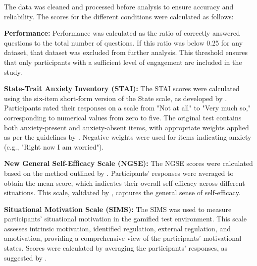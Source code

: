 The data was cleaned and processed before analysis to ensure accuracy and reliability. The scores for the different conditions were calculated as follows:

\begin{APAitemize}
\item \textbf{Performance:} Performance was calculated as the ratio of correctly answered questions to the total number of questions. If this ratio was below 0.25 for any dataset, that dataset was excluded from further analysis. This threshold ensures that only participants with a sufficient level of engagement are included in the study.

\item \textbf{State-Trait Anxiety Inventory (STAI):} The STAI scores were calculated using the six-item short-form version of the State scale, as developed by \textcite{marteauDevelopmentSixitemShortform1992}. Participants rated their responses on a scale from "Not at all" to "Very much so," corresponding to numerical values from zero to five. The original test contains both anxiety-present and anxiety-absent items, with appropriate weights applied as per the guidelines by \textcite{marteauDevelopmentSixitemShortform1992}. Negative weights were used for items indicating anxiety (e.g., "Right now I am worried").

\item \textbf{New General Self-Efficacy Scale (NGSE):} The NGSE scores were calculated based on the method outlined by \textcite{chenValidationNewGeneral2001}. Participants' responses were averaged to obtain the mean score, which indicates their overall self-efficacy across different situations. This scale, validated by \textcite{chenValidationNewGeneral2001}, captures the general sense of self-efficacy.

\item \textbf{Situational Motivation Scale (SIMS):} The SIMS was used to measure participants' situational motivation in the gamified test environment. This scale assesses intrinsic motivation, identified regulation, external regulation, and amotivation, providing a comprehensive view of the participants' motivational states. Scores were calculated by averaging the participants' responses, as suggested by \textcite{guayAssessmentSituationalIntrinsic2000}.
\end{APAitemize}